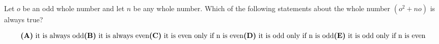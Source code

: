 

Let $ o$ be an odd whole number and let $ n$ be any whole number. Which of the following statements about the whole number $ (o^2+no)$ is always true?

\[ \textbf{(A)}\ \text{it is always odd} \\
\textbf{(B)}\ \text{it is always even} \\
\textbf{(C)}\ \text{it is even only if n is even} \\
\textbf{(D)}\ \text{it is odd only if n is odd} \\
\textbf{(E)}\ \text{it is odd only if n is even}
\]
